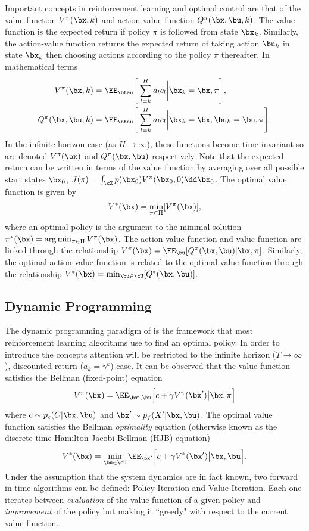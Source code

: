 Important concepts in reinforcement learning and optimal control are that of the value function $V^\pi(\bx,k)$ and action-value function $Q^\pi(\bx,\bu,k)$. The value function is the expected return if policy $\pi$ is followed from state $\bx_k$. Similarly, the action-value function returns the expected return of taking action $\bu_k$ in state $\bx_k$ then choosing actions according to the policy $\pi$ thereafter. In mathematical terms 
\begin{align}
V^\pi(\bx,k) &= \EE_{\btau}\Bigg[ \sum^H_{l=k} a_lc_l \bigg|\bx_k=\bx,\pi \Bigg], \\
Q^\pi(\bx,\bu,k) &= \EE_{\btau}\Bigg[ \sum^H_{l=k} a_lc_l \bigg|\bx_k=\bx,\bu_k=\bu,\pi \Bigg].
\end{align}
In the infinite horizon case (as $H\rightarrow\infty$), these functions become time-invariant so are denoted $V^\pi(\bx)$ and $Q^\pi(\bx,\bu)$ respectively. Note that the expected return can be written in terms of the value function by averaging over all possible start states $\bx_0$, $J(\pi) = \int_{\cX} p(\bx_0)V^\pi(\bx_0,0)\dd\bx_0$.
The optimal value function is given by
\begin{equation}
V^*(\bx) = \min_{\pi \in \Pi} [V^\pi(\bx)],
\end{equation}
where an optimal policy is the argument to the minimal solution $\pi^*(\bx) = \arg\min_{\pi \in \Pi} V^\pi(\bx)$. The action-value function and value function are linked through the relationship $V^\pi(\bx) = \EE_{\bu} [Q^\pi(\bx,\bu)|\bx,\pi]$. Similarly, the optimal action-value function is related to the optimal value function through the relationship $V^*(\bx) = \min_{\bu \in \cU} [Q^*(\bx,\bu)]$.




\subsection{Dynamic Programming}
The dynamic programming paradigm of \cite{Bell57} is the framework that most reinforcement learning algorithms use to find an optimal policy. In order to introduce the concepts attention will be restricted to the infinite horizon ($T \rightarrow \infty$), discounted return ($a_k=\gamma^k$) case. It can be observed that the value function satisfies the Bellman (fixed-point) equation
\begin{equation}
V^\pi(\bx) =  \EE_{\bx',\bu} \Big[ c + \gamma V^\pi(\bx') \big|\bx,\pi \Big]
\end{equation}
where $c \sim p_c(C|\bx,\bu)$ and $\bx' \sim p_f(X'|\bx,\bu)$. The optimal value function satisfies the Bellman \textit{optimality} equation (otherwise known as the discrete-time Hamilton-Jacobi-Bellman (HJB) equation)
\begin{equation}
V^*(\bx) = \min_{\bu\in\cU} \EE_{\bx'} \Big[c + \gamma V^*(\bx') \big|\bx,\bu\Big].
\end{equation}
Under the assumption that the system dynamics are in fact known, two forward in time algorithms can be defined: Policy Iteration and Value Iteration. Each one iterates between \textit{evaluation} of the value function of a given policy and \textit{improvement} of the policy but making it ``greedy" with respect to the current value function.


